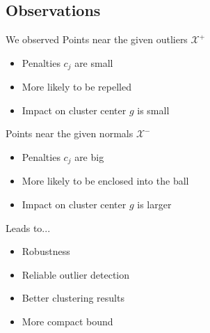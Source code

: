 \subsection{Observations}
\begin{frame}{We observed}
Points near the given outliers $\mathcal{X^+}$
\begin{itemize}
\item Penalties $c_j$ are small
\item More likely to be repelled
\item Impact on cluster center $g$ is small
\end{itemize}
\pause
Points near the given normals $\mathcal{X^-}$
\begin{itemize}
\item Penalties $c_j$ are big
\item More likely to be enclosed into the ball
\item Impact on cluster center $g$ is larger
\end{itemize}
\pause
Leads to...
\begin{itemize}
\item Robustness
\item Reliable outlier detection
\item Better clustering results
\item More compact bound
\end{itemize}
\end{frame}
